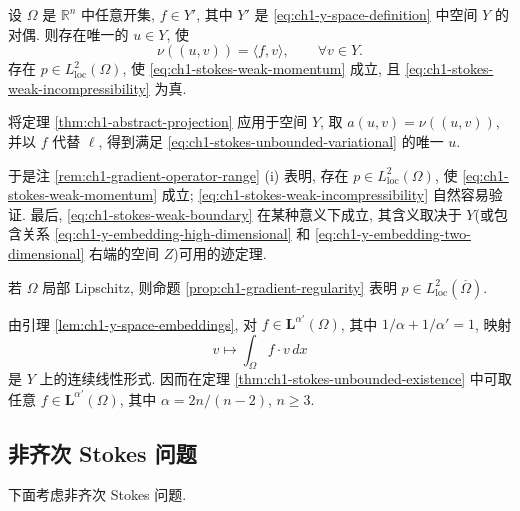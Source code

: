 \begin{Theorem}
\label{thm:ch1-stokes-unbounded-existence}
设 $\Omega$ 是 $\mathbb R^n$ 中任意开集, $f\in Y'$, 其中 $Y'$ 是 \eqref{eq:ch1-y-space-definition} 中空间 $Y$ 的对偶. 则存在唯一的 $u\in Y$, 使
\begin{equation}
\nu((u,v))=\langle f,v\rangle,
\qquad\forall v\in Y.
\label{eq:ch1-stokes-unbounded-variational}
\end{equation}
存在 $p\in L^2_{\mathrm{loc}}(\Omega)$, 使 \eqref{eq:ch1-stokes-weak-momentum} 成立, 且 \eqref{eq:ch1-stokes-weak-incompressibility} 为真.
\end{Theorem}

\begin{Proof}
将定理 \ref{thm:ch1-abstract-projection} 应用于空间 $Y$, 取 $a(u,v)=\nu((u,v))$, 并以 $f$ 代替 $\ell$, 得到满足 \eqref{eq:ch1-stokes-unbounded-variational} 的唯一 $u$.

于是注 \ref{rem:ch1-gradient-operator-range} (i) 表明, 存在 $p\in L^2_{\mathrm{loc}}(\Omega)$, 使 \eqref{eq:ch1-stokes-weak-momentum} 成立; \eqref{eq:ch1-stokes-weak-incompressibility} 自然容易验证. 最后, \eqref{eq:ch1-stokes-weak-boundary} 在某种意义下成立, 其含义取决于 $Y$(或包含关系 \eqref{eq:ch1-y-embedding-high-dimensional} 和 \eqref{eq:ch1-y-embedding-two-dimensional} 右端的空间 $Z$)可用的迹定理.

若 $\Omega$ 局部 Lipschitz, 则命题 \ref{prop:ch1-gradient-regularity} 表明 $p\in L^2_{\mathrm{loc}}(\overline\Omega)$.
\end{Proof}

\begin{Remark}
\label{rem:ch1-stokes-unbounded-data}
由引理 \ref{lem:ch1-y-space-embeddings}, 对 $f\in\mathbf L^{\alpha'}(\Omega)$, 其中 $1/\alpha+1/\alpha'=1$, 映射
\begin{equation}
v\longmapsto\int_\Omega f\cdot v\,dx
\label{eq:ch1-y-dual-integral}
\end{equation}
是 $Y$ 上的连续线性形式. 因而在定理 \ref{thm:ch1-stokes-unbounded-existence} 中可取任意 $f\in\mathbf L^{\alpha'}(\Omega)$, 其中 $\alpha=2n/(n-2)$, $n\geq3$.
\end{Remark}

\subsection{非齐次 Stokes 问题}
\label{subsec:ch1-nonhomogeneous-stokes}

下面考虑非齐次 Stokes 问题.

